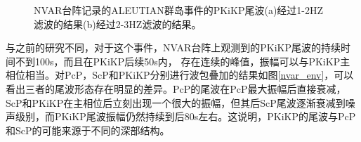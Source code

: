 \begin{figure}
\hfill{}
\hfill{}
\hfill{}
\caption{NVAR台阵记录的ALEUTIAN群岛事件的PKiKP尾波(a)经过1-2HZ滤波的结果(b)经过2-3HZ滤波的结果。}
\label{nvar_sec}
\end{figure}


与之前的研究不同，对于这个事件，NVAR台阵上观测到的PKiKP尾波的持续时间不到100s，而且在PKiKP后续50s内，
存在连续的峰值，振幅可以与PKiKP主相位相当。对PcP，ScP和PKiKP分别进行波包叠加的结果如图\ref{nvar_env}，可以看出三者的尾波形态存在明显的差异。PcP的尾波在PcP最大振幅后直接衰减，ScP和PKiKP在主相位后立刻出现一个很大的振幅，但其后ScP尾波逐渐衰减到噪声级别，而PKiKP尾波振幅仍然持续到后80s左右。这说明，PKiKP的尾波与PcP和ScP的可能来源于不同的深部结构。

